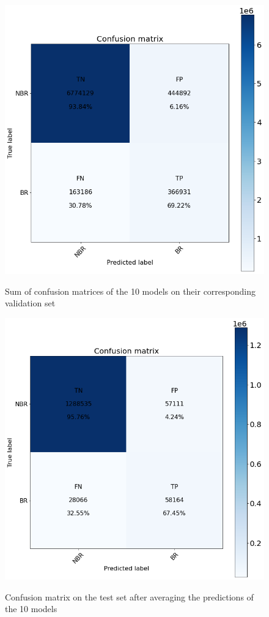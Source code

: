\documentclass[journal=jacsat,manuscript=article]{achemso}
\begin{document}
\begin{figure}
    \caption{\centering Sum of confusion matrices of the 10 models on their corresponding validation set}
    \centering
    \noindent\includegraphics[scale=0.4]{valid_cm.png}
    \label{fig:valid_cm}
\end{figure}
\begin{figure}
    \caption{\centering Confusion matrix on the test set after averaging the predictions of the 10 models}
    \centering
    \noindent\includegraphics[scale=0.4]{test_cm.png}
    \label{fig:test_cm}
\end{figure}
\end{document}
